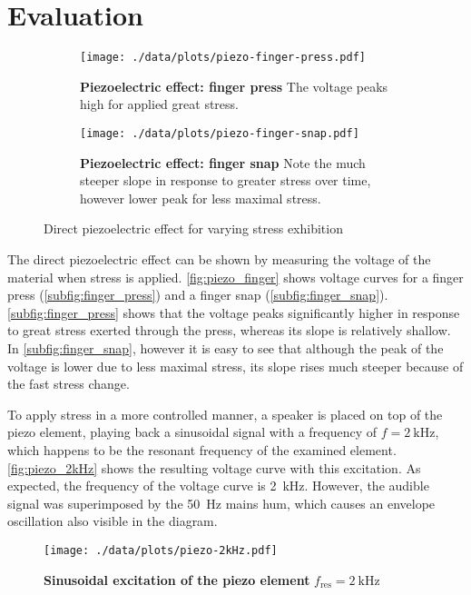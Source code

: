 \section{Evaluation}
\begin{figure}[tbp]
	\centering
	\begin{subfigure}{0.4\textwidth}
		\centering
		\texttt{[image: ./data/plots/piezo-finger-press.pdf]}
		\caption[Piezoelectric effect: finger press]{\textbf{Piezoelectric effect: finger press} The voltage peaks high for applied great stress.}
		\label{subfig:finger_press}
	\end{subfigure}\quad
	\begin{subfigure}{0.4\textwidth}
		\centering
		\texttt{[image: ./data/plots/piezo-finger-snap.pdf]}
		\caption[Piezoelectric effect: finger snap]{\textbf{Piezoelectric effect: finger snap} Note the much steeper slope in response to greater stress over time, however lower peak for less maximal stress.}
		\label{subfig:finger_snap}
	\end{subfigure}
	\caption{Direct piezoelectric effect for varying stress exhibition}
	\label{fig:piezo_finger}
\end{figure}
The direct piezoelectric effect can be shown by measuring the voltage of the material when stress is applied.
\autoref{fig:piezo_finger} shows voltage curves for a finger press (\autoref{subfig:finger_press}) and a finger snap (\autoref{subfig:finger_snap}).
\autoref{subfig:finger_press} shows that the voltage peaks significantly higher in response to great stress exerted through the press, whereas its slope is relatively shallow.
In \autoref{subfig:finger_snap}, however it is easy to see that although the peak of the voltage is lower due to less maximal stress, its slope rises much steeper because of the fast stress change.

To apply stress in a more controlled manner, a speaker is placed on top of the piezo element, playing back a sinusoidal signal with a frequency of $f=\SI{2}{\kilo\hertz}$, which happens to be the resonant frequency of the examined element.
\autoref{fig:piezo_2kHz} shows the resulting voltage curve with this excitation.
As expected, the frequency of the voltage curve is \SI{2}{\kilo\hertz}.
However, the audible signal was superimposed by the \SI{50}{\hertz} mains hum, which causes an envelope oscillation also visible in the diagram.
\begin{figure}[tbp]
	\centering
	\texttt{[image: ./data/plots/piezo-2kHz.pdf]}
	\caption[Sinusoidal excitation of the piezo element]{\textbf{Sinusoidal excitation of the piezo element} $f_\text{res}=\SI{2}{\kilo\hertz}$}
	\label{fig:piezo_2kHz}
\end{figure}
